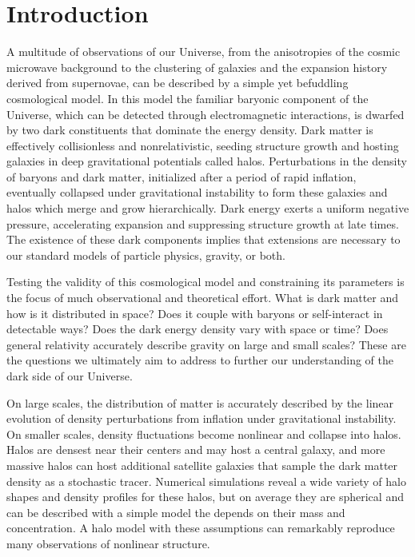 \chapter{Introduction}
\label{chap:intro}

%

A multitude of observations of our Universe, from the anisotropies of
the cosmic microwave background to the clustering of galaxies and the
expansion history derived from supernovae, can be described by a
simple yet befuddling cosmological model. In this model the familiar
baryonic component of the Universe, which can be detected through
electromagnetic interactions, is dwarfed by two dark constituents that
dominate the energy density. Dark matter is effectively collisionless
and nonrelativistic, seeding structure growth and hosting galaxies in
deep gravitational potentials called halos. Perturbations in the
density of baryons and dark matter, initialized after a period of
rapid inflation, eventually collapsed under gravitational instability
to form these galaxies and halos which merge and grow
hierarchically. Dark energy exerts a uniform negative pressure,
accelerating expansion and suppressing structure growth at late
times. The existence of these dark components implies that extensions
are necessary to our standard models of particle physics, gravity, or
both.

Testing the validity of this cosmological model and constraining its
parameters is the focus of much observational and theoretical effort.
What is dark matter and how is it distributed in space?  Does it
couple with baryons or self-interact in detectable ways?  Does the
dark energy density vary with space or time? Does general
relativity accurately describe gravity on large and small scales?
These are the questions we ultimately aim to address to further our
understanding of the dark side of our Universe.

On large scales, the distribution of matter is accurately described by
the linear evolution of density perturbations from inflation under
gravitational instability. On smaller scales, density fluctuations
become nonlinear and collapse into halos. Halos are densest near their
centers and may host a central galaxy, and more massive halos can host
additional satellite galaxies that sample the dark matter
density as a stochastic tracer. Numerical simulations reveal a wide
variety of halo shapes and density profiles for these halos, but on
average they are spherical and can be described with a simple model
the depends on their mass and concentration. A halo model with these
assumptions can remarkably reproduce many observations of
nonlinear structure.

